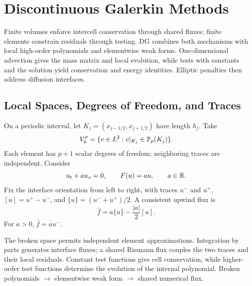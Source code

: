 \chapter{Discontinuous Galerkin Methods}\label{ch:10}
\begin{chaptersummary}
Finite volumes enforce intercell conservation through shared fluxes; finite elements constrain residuals through testing. DG combines both mechanisms with local high-order polynomials and elementwise weak forms. One-dimensional advection gives the mass matrix and local evolution, while tests with constants and the solution yield conservation and energy identities. Elliptic penalties then address diffusion interfaces.
\end{chaptersummary}

\section{Local Spaces, Degrees of Freedom, and Traces}
On a periodic interval, let $K_j=(x_{j-1/2},x_{j+1/2})$ have length $h_j$.
Take
\[
V_h^p=\{v\in L^2:v|_{K_j}\in\mathbb P_p(K_j)\}.
\]
Each element has $p+1$ scalar degrees of freedom; neighboring traces are independent. Consider
\[
u_t+a u_x=0,\qquad F(u)=au,\qquad a\in\mathbb R.
\]
Fix the interface orientation from left to right, with traces $u^-$ and $u^+$,
$[u]=u^+-u^-$, and $\{u\}=(u^-+u^+)/2$. A consistent upwind flux is
\[
\widehat f=a\{u\}-\frac{|a|}{2}[u].
\]
For $a>0$, $\widehat f=au^-$.

{The broken space permits independent element approximations. Integration by parts generates interface fluxes; a shared Riemann flux couples the two traces and their local residuals. Constant test functions give cell conservation, while higher-order test functions determine the evolution of the internal polynomial.}
{Broken polynomials $\longrightarrow$ elementwise weak form $\longrightarrow$ shared numerical flux.}


